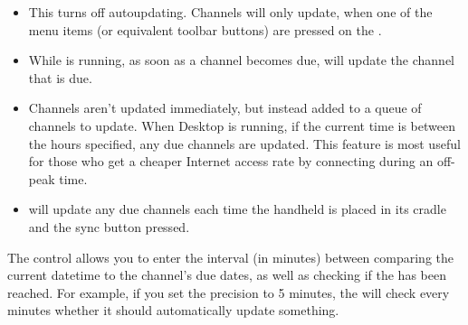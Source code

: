 \begin{itemize}
  \item {} This turns off autoupdating.
  Channels will only update, when one of the 
  menu items (or equivalent toolbar buttons) are pressed on the 
  \helpignore{\ref{sec:pd-main-dialog}}
  .
  
  \item {} While 
  \brandingapplicationdesktopname is running, as soon as a channel becomes due, \brandingapplicationdesktopname 
  will update the channel that is due.

  \item {} Channels aren't updated
  immediately, but instead added to a queue of channels to update. When \brandingapplicationsuitename
  Desktop is running, if the current time is between the hours specified, 
  any due channels are updated. This feature is most useful for those who get 
  a cheaper Internet access rate by connecting during an off-peak time.
  
  \item {} will update any due channels each time the handheld 
  is placed in its cradle and the sync button pressed.
\end{itemize}

The  control allows you to enter the interval (in 
minutes) between comparing the current datetime to the channel's due dates, as 
well as checking if the  has been 
reached. For example, if you set the precision to 5 minutes, the \brandingapplicationdesktopname 
will check every minutes whether it should automatically update something.




